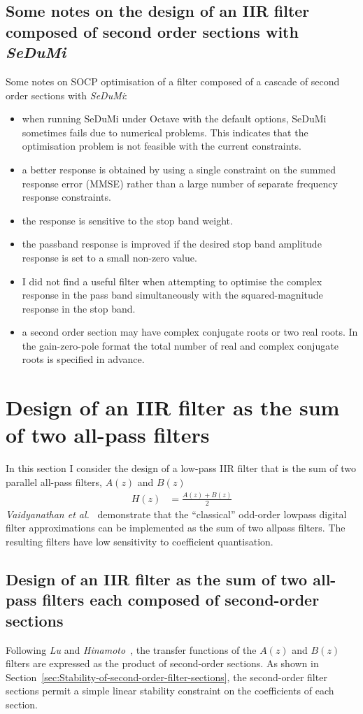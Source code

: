\documentclass[a4paper,twoside,10pt,english]{report}
\begin{document}
\subsection{Some notes on the design of an IIR filter composed of second order sections with \emph{SeDuMi}}
Some notes on SOCP optimisation of a filter composed of a cascade of second
order sections with \emph{SeDuMi}:
\begin{itemize}
\item{when running SeDuMi under Octave with the default options, SeDuMi 
  sometimes fails due to numerical problems. This indicates that the 
  optimisation problem is not feasible with the current constraints.}
\item{a better response is obtained by using a single constraint
  on the summed response error (MMSE) rather than a large number of separate
  frequency response constraints.}
\item{the response is sensitive to the stop band weight.}
\item{the passband response is improved if the desired stop band amplitude
  response is set to a small non-zero value.}
\item{I did not find a useful filter when attempting to optimise the complex 
  response in the pass band simultaneously with the squared-magnitude response
  in the stop band.}
\item{a second order section may have complex conjugate roots or two real roots.
  In the gain-zero-pole format the total number of real and complex conjugate
  roots is specified in advance.}
\end{itemize}
\clearpage
\section{Design of an IIR filter as the sum of two all-pass filters}
In this section I consider the design of a low-pass IIR filter that is the sum
of two parallel all-pass filters, $A\left(z\right)$ and $B\left(z\right)$
\begin{align}
H\left(z\right) &= \frac{A\left(z\right) + B\left(z\right)}{2}
\label{eqn:Parallel-allpass-transfer-function}  
\end{align}
\emph{Vaidyanathan et al.}~\cite{VaidyanathanMitraNuevo_LowSensitivityIIRDigitalFilters}
demonstrate that the ``classical'' odd-order lowpass digital filter 
approximations can be implemented as the sum of two allpass filters. The 
resulting filters have low sensitivity to coefficient quantisation. 
\subsection{\label{sec:Parallel-Allpass-2nd-Order-Sections}Design of an IIR filter as the sum of two all-pass filters each composed of second-order sections}
Following \emph{Lu} and 
\emph{Hinamoto}~\cite{LuHinamoto_IIRRobustStabilityQuadraticProgramming}, 
the transfer functions of the $A\left(z\right)$ and $B\left(z\right)$ filters 
are expressed as the product of second-order sections. As shown in 
Section~\ref{sec:Stability-of-second-order-filter-sections}, the second-order
filter sections permit a simple linear stability constraint on the coefficients
of each section.
\end{document}
